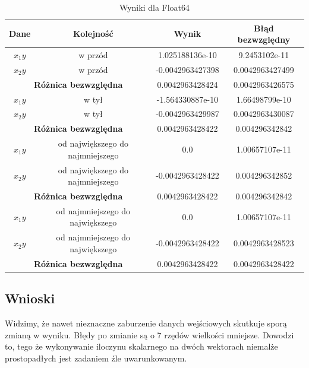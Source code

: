 \documentclass{article}
\begin{document}
{
\begin{table}[H]
  \centering
  \begin{tabular}{|c|c|c|c|}
    \toprule
    \textbf{Dane} & \textbf{Kolejność} & \textbf{Wynik} & \textbf{Błąd bezwzględny}\\
    \midrule
    $x_1y$ & w przód & 1.025188136e-10 & 9.2453102e-11 \\
    $x_2y$ & w przód & -0.0042963427398 & 0.0042963427499 \\
    \hline  %
    \multicolumn{2}{|c|}{\textbf{Różnica bezwzględna}} & 0.0042963428424 & 0.0042963426575 \\
    \hline  %
    $x_1y$ & w tył & -1.564330887e-10 & 1.66498799e-10 \\
    $x_2y$ & w tył & -0.0042963429987 & 0.0042963430087 \\
    \hline  %
    \multicolumn{2}{|c|}{\textbf{Różnica bezwzględna}} & 0.0042963428422 & 0.004296342842 \\
    \hline  %
    $x_1y$ & od największego do najmniejszego & 0.0 & 1.00657107e-11 \\
    $x_2y$ & od największego do najmniejszego & -0.0042963428422 & 0.004296342852 \\
    \hline  %
    \multicolumn{2}{|c|}{\textbf{Różnica bezwzględna}} & 0.0042963428422 & 0.004296342842 \\
    \hline  %
    $x_1y$ & od najmniejszego do największego & 0.0 & 1.00657107e-11 \\
    $x_2y$ & od najmniejszego do największego & -0.0042963428422 & 0.0042963428523 \\
    \hline  %
    \multicolumn{2}{|c|}{\textbf{Różnica bezwzględna}} & 0.0042963428422 & 0.0042963428422 \\
    \bottomrule
  \end{tabular}
  \caption{Wyniki dla Float64}
\end{table}
}
\subsection*{Wnioski}
Widzimy, że nawet nieznaczne zaburzenie danych wejściowych skutkuje sporą zmianą
w wyniku. Błędy po zmianie są o 7 rzędów wielkości mniejsze. Dowodzi to, tego że
wykonywanie iloczynu skalarnego na dwóch wektorach niemalże prostopadłych jest
zadaniem źle uwarunkowanym.
\end{document}
